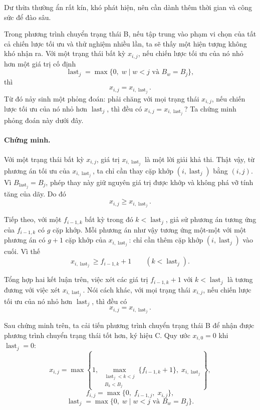 \documentclass[11pt]{article}
\begin{document}
Dư thừa thường ẩn rất kín, khó phát hiện, nên cần dành thêm thời gian và công
sức để đào sâu.

Trong phương trình chuyển trạng thái B, nếu tập trung vào phạm vi chọn của tất
cả chiến lược tối ưu và thử nghiệm nhiều lần, ta sẽ thấy một hiện tượng không
khó nhận ra. Với một trạng thái bất kỳ $x_{i,j}$, nếu chiến lược tối ưu của nó
nhỏ hơn một giá trị cố định
\[
  \operatorname{last}_j=\max\{0,\;w\mid w<j\text{ và }B_w=B_j\},
\]
thì
\[
  x_{i,j}=x_{i,\operatorname{last}_j}.
\]
Từ đó nảy sinh một phỏng đoán: phải chăng với mọi trạng thái $x_{i,j}$, nếu
chiến lược tối ưu của nó nhỏ hơn $\operatorname{last}_j$, thì đều có
$x_{i,j}=x_{i,\operatorname{last}_j}$? Ta chứng minh phỏng đoán này dưới đây.

\paragraph{Chứng minh.}
Với một trạng thái bất kỳ $x_{i,j}$, giá trị $x_{i,\operatorname{last}_j}$ là
một lời giải khả thi. Thật vậy, từ phương án tối ưu của
$x_{i,\operatorname{last}_j}$, ta chỉ cần thay cặp khớp
$(i,\operatorname{last}_j)$ bằng $(i,j)$. Vì
$B_{\operatorname{last}_j}=B_j$, phép thay này giữ nguyên giá trị được khớp và
không phá vỡ tính tăng của dãy. Do đó
\[
  x_{i,j}\ge x_{i,\operatorname{last}_j}.
\]

Tiếp theo, với một $f_{i-1,k}$ bất kỳ trong đó $k<\operatorname{last}_j$, giả
sử phương án tương ứng của $f_{i-1,k}$ có $g$ cặp khớp. Mỗi phương án như vậy
tương ứng một-một với một phương án có $g+1$ cặp khớp của
$x_{i,\operatorname{last}_j}$: chỉ cần thêm cặp khớp
$(i,\operatorname{last}_j)$ vào cuối. Vì thế
\[
  x_{i,\operatorname{last}_j}\ge f_{i-1,k}+1
  \qquad (k<\operatorname{last}_j).
\]

Tổng hợp hai kết luận trên, việc xét các giá trị $f_{i-1,k}+1$ với
$k<\operatorname{last}_j$ là tương đương với việc xét
$x_{i,\operatorname{last}_j}$. Nói cách khác, với mọi trạng thái $x_{i,j}$,
nếu chiến lược tối ưu của nó nhỏ hơn $\operatorname{last}_j$, thì đều có
\[
  x_{i,j}=x_{i,\operatorname{last}_j}.
\]

Sau chứng minh trên, ta cải tiến phương trình chuyển trạng thái B để nhận được
phương trình chuyển trạng thái tốt hơn, ký hiệu C. Quy ước
$x_{i,0}=0$ khi $\operatorname{last}_j=0$:
\[
  x_{i,j}=
  \max\left\{
    1,\;
    \max_{\substack{\operatorname{last}_j<k<j\\ B_k<B_j}}
      \{f_{i-1,k}+1\},\;
    x_{i,\operatorname{last}_j}
  \right\},
\]
\[
  f_{i,j}=\max\{0,\;f_{i-1,j},\;x_{i,j}\},
\]
\[
  \operatorname{last}_j=\max\{0,\;w\mid w<j\text{ và }B_w=B_j\}.
\]
\end{document}
